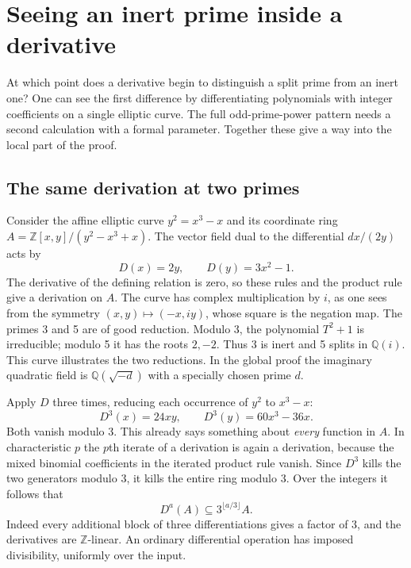 \documentclass[11pt,letterpaper]{article}
\begin{document}
\section{Seeing an inert prime inside a derivative}
\label{sec:local-prime}

At which point does a derivative begin to distinguish a split prime from an inert one? One can see the first difference by differentiating polynomials with integer coefficients on a single elliptic curve. The full odd-prime-power pattern needs a second calculation with a formal parameter. Together these give a way into the local part of the proof.

\subsection{The same derivation at two primes}

Consider the affine elliptic curve \(y^2=x^3-x\) and its coordinate ring
\(A=\mathbb Z[x,y]/(y^2-x^3+x)\). The vector field dual to the differential \(dx/(2y)\) acts by
\[
 D(x)=2y,\qquad D(y)=3x^2-1.
\]
The derivative of the defining relation is zero, so these rules and the product rule give a derivation on \(A\). The curve has complex multiplication by \(i\), as one sees from the symmetry \((x,y)\mapsto(-x,iy)\), whose square is the negation map. The primes 3 and 5 are of good reduction. Modulo 3, the polynomial \(T^2+1\) is irreducible; modulo 5 it has the roots \(2,-2\). Thus 3 is inert and 5 splits in \(\mathbb Q(i)\). This curve illustrates the two reductions. In the global proof the imaginary quadratic field is \(\mathbb Q(\sqrt{-d})\) with a specially chosen prime \(d\).

Apply \(D\) three times, reducing each occurrence of \(y^2\) to \(x^3-x\):
\[
 D^3(x)=24xy,\qquad D^3(y)=60x^3-36x .
\]
Both vanish modulo 3. This already says something about \emph{every} function in \(A\). In characteristic \(p\) the \(p\)th iterate of a derivation is again a derivation, because the mixed binomial coefficients in the iterated product rule vanish. Since \(D^3\) kills the two generators modulo 3, it kills the entire ring modulo 3. Over the integers it follows that
\[
               D^a(A)\subseteq 3^{\lfloor a/3\rfloor}A .
\]
Indeed every additional block of three differentiations gives a factor of 3, and the derivatives are \(\mathbb Z\)-linear. An ordinary differential operation has imposed divisibility, uniformly over the input.
\end{document}
